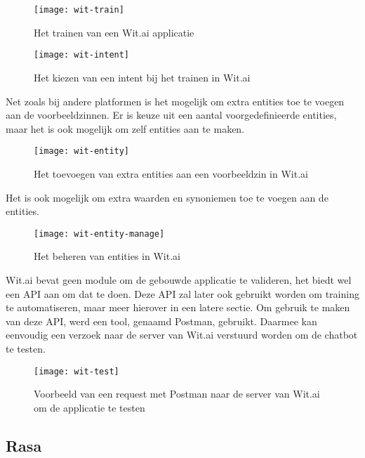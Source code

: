 \begin{figure}[H]
    \label{fig:wit-train}
    \centering
    \texttt{[image: wit-train]}
    \caption{Het trainen van een Wit.ai applicatie}
\end{figure}

\begin{figure}[H]
    \label{fig:wit-intent}
    \centering
    \texttt{[image: wit-intent]}
    \caption{Het kiezen van een intent bij het trainen in Wit.ai}
\end{figure}

Net zoals bij andere platformen is het mogelijk om extra entities toe te voegen aan de voorbeeldzinnen. Er is keuze uit een aantal voorgedefinieerde entities, maar het is ook mogelijk om zelf entities aan te maken.

\begin{figure}[H]
    \label{fig:wit-entity}
    \centering
    \texttt{[image: wit-entity]}
    \caption{Het toevoegen van extra entities aan een voorbeeldzin in Wit.ai}
\end{figure}

Het is ook mogelijk om extra waarden en synoniemen toe te voegen aan de entities.

\begin{figure}[H]
    \label{fig:wit-intent-manage}
    \centering
    \texttt{[image: wit-entity-manage]}
    \caption{Het beheren van entities in Wit.ai}
\end{figure}

Wit.ai bevat geen module om de gebouwde applicatie te valideren, het biedt wel een API aan om dat te doen. Deze API zal later ook gebruikt worden om training te automatiseren, maar meer hierover in een latere sectie. Om gebruik te maken van deze API, werd een tool, genaamd Postman, gebruikt. Daarmee kan eenvoudig een verzoek naar de server van Wit.ai verstuurd worden om de chatbot te testen.

\begin{figure}[H]
    \label{fig:wit-test}
    \centering
    \texttt{[image: wit-test]}
    \caption{Voorbeeld van een request met Postman naar de server van Wit.ai om de applicatie te testen}
\end{figure}

\subsection{Rasa}
\label{subsec:werking-platformen-rasa}

